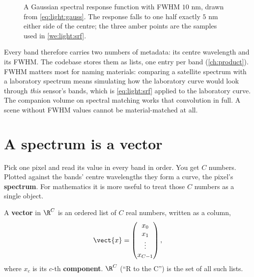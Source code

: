 \begin{figure}[htbp]\centering
{}
\caption{A Gaussian spectral response function with FWHM $10$ nm, drawn from
\cref{eq:light:gauss}. The response falls to one half exactly $5$ nm either side of the centre;
the three amber points are the samples used in \cref{we:light:srf}.}\label{fig:light:srf}
\end{figure}

Every band therefore carries two numbers of metadata: its centre wavelength and its FWHM. The
codebase stores them as lists, one entry per band (\cref{ch:product}). FWHM matters most for
naming materials: comparing a satellite spectrum with a laboratory spectrum means simulating how
the laboratory curve would look through \emph{this} sensor's bands, which is
\cref{eq:light:srf} applied to the laboratory curve. The companion volume on spectral matching
works that convolution in full. A scene without FWHM values cannot be material-matched at all.

\section{A spectrum is a vector}\label{sec:light:spectrum}

Pick one pixel and read its value in every band in order. You get $C$ numbers. Plotted against
the bands' centre wavelengths they form a curve, the pixel's
\textbf{spectrum}. For mathematics it is more useful to treat those $C$ numbers as
a single object.

\begin{definition}[Vector]
A \textbf{vector} in $\R^C$ is an ordered list of $C$ real numbers, written as a column,
\[ \vect{x} = \begin{pmatrix} x_0 \\ x_1 \\ \vdots \\ x_{C-1} \end{pmatrix}, \]
where $x_c$ is its $c$-th \textbf{component}. $\R^C$ (``R to the C'') is the set of all such
lists.
\end{definition}

